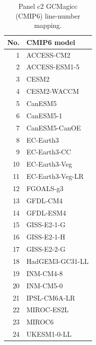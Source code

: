 \begin{table}[tp]
\centering
\footnotesize
\begin{tabular}{rl}
\toprule
No. & CMIP6 model \\
\midrule
1 & ACCESS-CM2 \\
2 & ACCESS-ESM1-5 \\
3 & CESM2 \\
4 & CESM2-WACCM \\
5 & CanESM5 \\
6 & CanESM5-1 \\
7 & CanESM5-CanOE \\
8 & EC-Earth3 \\
9 & EC-Earth3-CC \\
10 & EC-Earth3-Veg \\
11 & EC-Earth3-Veg-LR \\
12 & FGOALS-g3 \\
13 & GFDL-CM4 \\
14 & GFDL-ESM4 \\
15 & GISS-E2-1-G \\
16 & GISS-E2-1-H \\
17 & GISS-E2-2-G \\
18 & HadGEM3-GC31-LL \\
19 & INM-CM4-8 \\
20 & INM-CM5-0 \\
21 & IPSL-CM6A-LR \\
22 & MIROC-ES2L \\
23 & MIROC6 \\
24 & UKESM1-0-LL \\
\bottomrule
\end{tabular}
\caption{Panel c2 GCMagicc (CMIP6) line-number mapping.}
\label{tab:observational_alignment_panel_c2_gcmagicc_cmip6_model_numbers}
\end{table}
